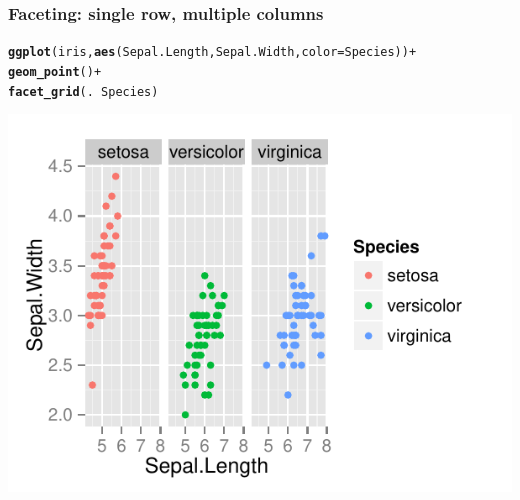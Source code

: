 \documentclass{beamer}\usepackage[]{graphicx}\usepackage[]{color}
\makeatletter
\newcommand{\hlopt}[1]{\textcolor[rgb]{0,0,0}{#1}}%
\newcommand{\hlstd}[1]{\textcolor[rgb]{0.345,0.345,0.345}{#1}}%
\newcommand{\hlkwc}[1]{\textcolor[rgb]{0.333,0.667,0.333}{#1}}%
\newcommand{\hlkwd}[1]{\textcolor[rgb]{0.737,0.353,0.396}{\textbf{#1}}}%
\newenvironment{kframe}{%
 \def\at@end@of@kframe{}%
 \ifinner\ifhmode%
  \def\at@end@of@kframe{\end{minipage}}%
  \begin{minipage}{\columnwidth}%
 \fi\fi%
 \def\FrameCommand##1{\hskip\@totalleftmargin \hskip-\fboxsep
 \colorbox{shadecolor}{##1}\hskip-\fboxsep
     \hskip-\linewidth \hskip-\@totalleftmargin \hskip\columnwidth}%
 \MakeFramed {\advance\hsize-\width
   \@totalleftmargin\z@ \linewidth\hsize
   \@setminipage}}%
 {\par\unskip\endMakeFramed%
 \at@end@of@kframe}
\newenvironment{knitrout}{}{} %
\makeatother
\begin{document}
\begin{frame}[fragile]
\frametitle{Faceting: single row, multiple columns}
\begin{knitrout}\footnotesize
{}\color{fgcolor}\begin{kframe}
\begin{alltt}
\hlkwd{ggplot}\hlstd{(iris,} \hlkwd{aes}\hlstd{(Sepal.Length, Sepal.Width,} \hlkwc{color} \hlstd{= Species))} \hlopt{+}
    \hlkwd{geom_point}\hlstd{()} \hlopt{+}
    \hlkwd{facet_grid}\hlstd{(.} \hlopt{~} \hlstd{Species)}
\end{alltt}
\end{kframe}

{\centering \includegraphics[width=.75\linewidth]{figure/facet_grid2} 

}



\end{knitrout}
\end{frame}

\end{document}
